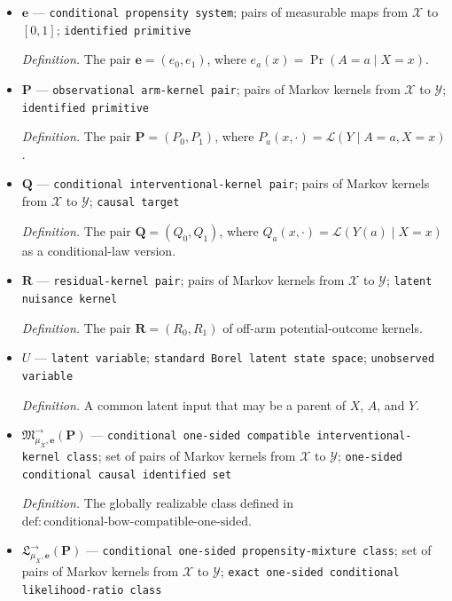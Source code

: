 \documentclass{article}
\begin{document}
\begin{itemize}
  \par\smallskip\noindent\emph{Definition.} \texttt{A common lower bound for both conditional arm propensities and their complements.}
  \item \(\boldsymbol e\) --- \texttt{conditional propensity system}; pairs of measurable maps from \(\mathcal X\) to \([0,1]\); \texttt{identified primitive}
  \par\smallskip\noindent\emph{Definition.} The pair \(\boldsymbol e=(e_0,e_1)\), where \(e_a(x)=\Pr(A=a\mid X=x)\).
  \item \(\boldsymbol P\) --- \texttt{observational arm-\allowbreak{}kernel pair}; pairs of Markov kernels from \(\mathcal X\) to \(\mathcal Y\); \texttt{identified primitive}
  \par\smallskip\noindent\emph{Definition.} The pair \(\boldsymbol P=(P_0,P_1)\), where \(P_a(x,\cdot)=\mathcal L(Y\mid A=a,X=x)\).
  \item \(\boldsymbol Q\) --- \texttt{conditional interventional-\allowbreak{}kernel pair}; pairs of Markov kernels from \(\mathcal X\) to \(\mathcal Y\); \texttt{causal target}
  \par\smallskip\noindent\emph{Definition.} The pair \(\boldsymbol Q=(Q_0,Q_1)\), where \(Q_a(x,\cdot)=\mathcal L(Y(a)\mid X=x)\) as a conditional-law version.
  \item \(\boldsymbol R\) --- \texttt{residual-\allowbreak{}kernel pair}; pairs of Markov kernels from \(\mathcal X\) to \(\mathcal Y\); \texttt{latent nuisance kernel}
  \par\smallskip\noindent\emph{Definition.} The pair \(\boldsymbol R=(R_0,R_1)\) of off-arm potential-outcome kernels.
  \item \(U\) --- \texttt{latent variable}; \texttt{standard Borel latent state space}; \texttt{unobserved variable}
  \par\smallskip\noindent\emph{Definition.} A common latent input that may be a parent of \(X\), \(A\), and \(Y\).
  \item \(\mathfrak M^{\to}_{\mu_X,\boldsymbol e}(\boldsymbol P)\) --- \texttt{conditional one-\allowbreak{}sided compatible interventional-\allowbreak{}kernel class}; set of pairs of Markov kernels from \(\mathcal X\) to \(\mathcal Y\); \texttt{one-\allowbreak{}sided conditional causal identified set}
  \par\smallskip\noindent\emph{Definition.} The globally realizable class defined in \(\mathrm{def:conditional\text{-}bow\text{-}compatible\text{-}one\text{-}sided}\).
  \item \(\mathfrak L^{\to}_{\mu_X,\boldsymbol e}(\boldsymbol P)\) --- \texttt{conditional one-\allowbreak{}sided propensity-\allowbreak{}mixture class}; set of pairs of Markov kernels from \(\mathcal X\) to \(\mathcal Y\); \texttt{exact one-\allowbreak{}sided conditional likelihood-\allowbreak{}ratio class}

\end{itemize}
\end{document}
